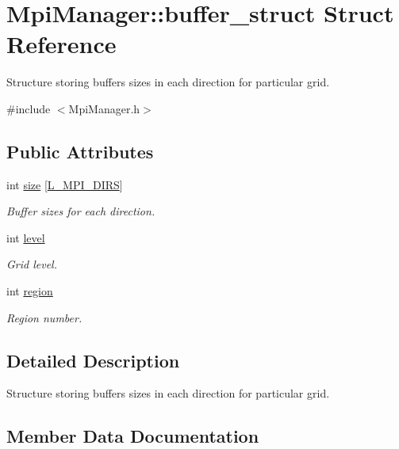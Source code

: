 \hypertarget{struct_mpi_manager_1_1buffer__struct}{}\section{Mpi\+Manager\+:\+:buffer\+\_\+struct Struct Reference}
\label{struct_mpi_manager_1_1buffer__struct}


Structure storing buffers sizes in each direction for particular grid.  




{\ttfamily \#include $<$Mpi\+Manager.\+h$>$}

\subsection*{Public Attributes}
\begin{DoxyCompactItemize}
\item 
int \hyperlink{struct_mpi_manager_1_1buffer__struct_a1d38a439ae551da0a708d7a8b39f5c76}{size} \mbox{[}\hyperlink{definitions_8h_a144328eed4e90ebcf8a9f66aa7337266}{L\+\_\+\+M\+P\+I\+\_\+\+D\+I\+RS}\mbox{]}
\begin{DoxyCompactList}\small\item\em Buffer sizes for each direction. \end{DoxyCompactList}\item 
int \hyperlink{struct_mpi_manager_1_1buffer__struct_adc6bb3b15665e3fb5834e6134395e1f9}{level}
\begin{DoxyCompactList}\small\item\em Grid level. \end{DoxyCompactList}\item 
int \hyperlink{struct_mpi_manager_1_1buffer__struct_a81730a85a03630880e8c378fcb8d3298}{region}
\begin{DoxyCompactList}\small\item\em Region number. \end{DoxyCompactList}\end{DoxyCompactItemize}


\subsection{Detailed Description}
Structure storing buffers sizes in each direction for particular grid. 

\subsection{Member Data Documentation}
